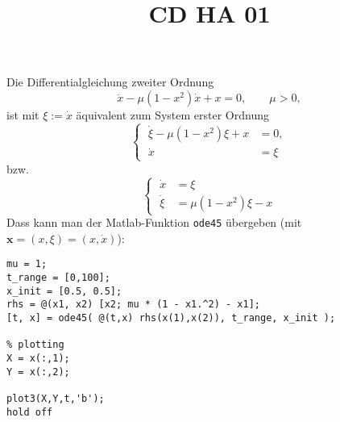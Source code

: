 \documentclass[a4paper]{article}
\title{CD HA 01}
\begin{document}
\section{}
Die Differentialgleichung zweiter Ordnung
\begin{equation}
    \label{eqn:diff1}
    \ddot{x} - μ ( 1 - x^2) \dot x + x = 0, \qquad μ>0,
\end{equation}
ist mit $ξ := \dot x$ äquivalent zum System erster Ordnung
\begin{equation*}
    \left \{ \; \begin{aligned}
    \dot ξ - μ(1-x^2) ξ + x &= 0,\\
    \dot x &= ξ 
    \end{aligned}\right.
\end{equation*}
bzw.
\begin{equation}
    \label{eqn:diff2}
    \left\{ \; \begin{aligned}
    \dot x &= ξ\\
    \dot ξ &= μ(1-x^2)ξ - x
    \end{aligned} \right.
\end{equation}
Dass kann man der Matlab-Funktion \verb!ode45! übergeben (mit $\mathbf x = (x, ξ) = (x,\dot x)$):
\begin{verbatim}
mu = 1;
t_range = [0,100];
x_init = [0.5, 0.5];
rhs = @(x1, x2) [x2; mu * (1 - x1.^2) - x1];
[t, x] = ode45( @(t,x) rhs(x(1),x(2)), t_range, x_init );

% plotting
X = x(:,1);
Y = x(:,2);

plot3(X,Y,t,'b');
hold off
\end{verbatim}


\section{}
\end{document}
